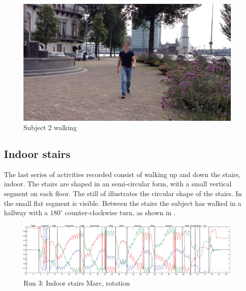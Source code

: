 \begin{figure}
\centering
  \includegraphics[width=1\textwidth]{./Figures/chapter6/data_collection/stills/roemer_walk.png}
  \caption[Recording still 7]{Subject 2 walking}
  \label{fig:data_gathering_still_2_walk}
\end{figure}



\subsection{Indoor stairs}\label{subsec:indoor_stairs}
The last series of activities recorded consist of walking up and down the stairs, indoor.
The stairs are shaped in an semi-circular form, with a small vertical segment on each floor.
The still of  illustrates the circular shape of the stairs.
In  the small flat segment is visible.
Between the stairs the subject has walked in a hallway with a $180^{\circ}$ counter-clockwise turn, as shown in .

\begin{figure}
\centering
  \includegraphics[width=1\textwidth]{./Figures/chapter6/data_collection/stairs-1-marc/data_plot_rot_annotated.eps}
  \caption[R3: rotation]{Run 3: Indoor stairs Marc, rotation}
  \label{fig:data_gathering_run_3_rot}
\end{figure}

